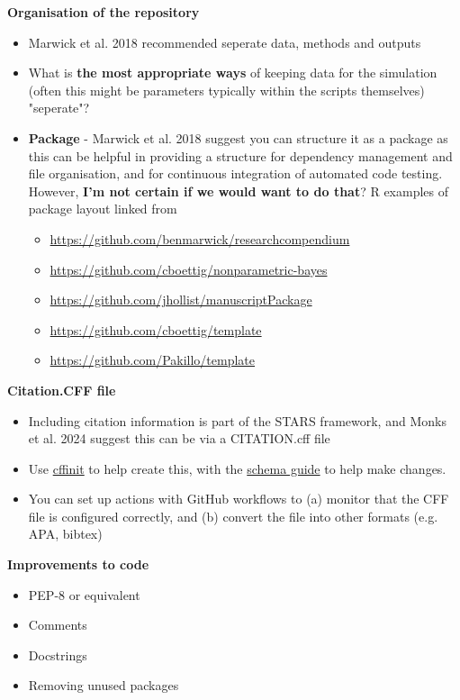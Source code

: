 \textbf{Organisation of the repository}
\begin{itemize}
    \item Marwick et al. 2018\autocite{marwick_packaging_2018} recommended seperate data, methods and outputs
    \item What is \textbf{the most appropriate ways} of keeping data for the simulation (often this might be parameters typically within the scripts themselves) "seperate"?
    \item \textbf{Package} - Marwick et al. 2018\autocite{marwick_packaging_2018} suggest you can structure it as a package as this can be helpful in providing a structure for dependency management and file organisation, and for continuous integration of automated code testing. However, \textbf{I'm not certain if we would want to do that}? R examples of package layout linked from \autocite{marwick_packaging_2018}
    \begin{itemize}
        \item \url{https://github.com/benmarwick/researchcompendium}
        \item \url{https://github.com/cboettig/nonparametric-bayes}
        \item \url{https://github.com/jhollist/manuscriptPackage}
        \item \url{https://github.com/cboettig/template}
        \item \url{https://github.com/Pakillo/template}
    \end{itemize}
\end{itemize}

\textbf{Citation.CFF file}
\begin{itemize}
    \item Including citation information is part of the STARS framework, and Monks et al. 2024\autocite{monks_towards_2024} suggest this can be via a CITATION.cff file
    \item Use \href{https://citation-file-format.github.io/cff-initializer-javascript/#}{cffinit} to help create this, with the \href{https://github.com/citation-file-format/citation-file-format/blob/main/schema-guide.md}{schema guide} to help make changes.
    \item You can set up actions with GitHub workflows to (a) monitor that the CFF file is configured correctly, and (b) convert the file into other formats (e.g. APA, bibtex)
\end{itemize}

\textbf{Improvements to code}
\begin{itemize}
    \item PEP-8 or equivalent
    \item Comments
    \item Docstrings
    \item Removing unused packages
\end{itemize}

